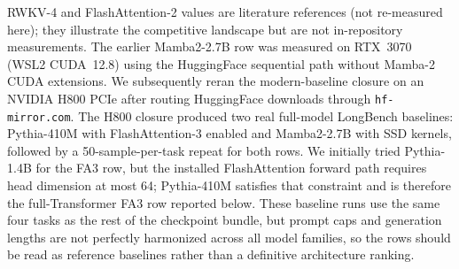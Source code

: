 RWKV-4 and FlashAttention-2 values are literature references (not re-measured
here); they illustrate the competitive landscape but are not in-repository
measurements.  The earlier Mamba2-2.7B row was measured on RTX~3070 (WSL2
CUDA~12.8) using the HuggingFace sequential path without Mamba-2 CUDA
extensions.  We subsequently reran the modern-baseline closure on an NVIDIA
H800 PCIe after routing HuggingFace downloads through \texttt{hf-mirror.com}.
The H800 closure produced two real full-model LongBench baselines: Pythia-410M
with FlashAttention-3 enabled and Mamba2-2.7B with SSD kernels, followed by a
50-sample-per-task repeat for both rows.  We initially
tried Pythia-1.4B for the FA3 row, but the installed FlashAttention forward path
requires head dimension at most 64; Pythia-410M satisfies that constraint and is
therefore the full-Transformer FA3 row reported below.  These baseline runs use
the same four tasks as the rest of the checkpoint bundle, but prompt caps and
generation lengths are not perfectly harmonized
across all model families, so the rows should be read as reference baselines
rather than a definitive architecture ranking.

